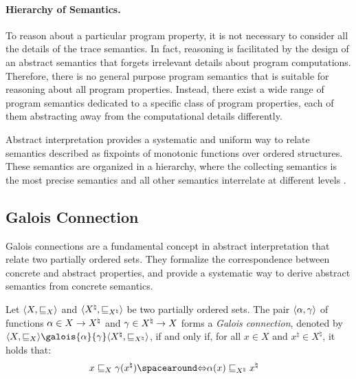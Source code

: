 \paragraph{Hierarchy of Semantics.}

To reason about a particular program property, it is not necessary to consider all the details of the trace semantics.
In fact, reasoning is facilitated by the design of an abstract semantics that forgets irrelevant details about program computations.
Therefore, there is no general purpose program semantics that is suitable for reasoning about all program properties.
Instead, there exist a wide range of program semantics dedicated to a specific class of program properties, each of them abstracting away from the computational details differently.

Abstract interpretation provides a systematic and uniform way to relate semantics described as fixpoints of monotonic functions over ordered structures.
These semantics are organized in a hierarchy, where the collecting semantics is the most precise semantics and all other semantics interrelate at different levels .



\subsection{Galois Connection}

Galois connections are a fundamental concept in abstract interpretation that relate two partially ordered sets.
They formalize the correspondence between concrete and abstract properties, and provide a systematic way to derive abstract semantics from concrete semantics.

\begin{definition}
  Let $\langle X, \sqsubseteq_X \rangle$ and $\langle {X^\natural}, \sqsubseteq_{X^\natural} \rangle$ be two partially ordered sets.
  The pair $\langle \alpha, \gamma \rangle$ of functions $\alpha\in X \to {X^\natural}$ and $\gamma\in {X^\natural} \to X$ forms a \emph{Galois connection}, denoted by $\tuple{X}{\sqsubseteq_X}\galois{\abstraction}{\concretization}\tuple{{X^\natural}}{\sqsubseteq_{X^\natural}}$, if and only if, for all $x\in X$ and ${x^\natural}\in {X^\natural}$, it holds that:
  \begin{align*}
    x \sqsubseteq_X \concretization({x^\natural}) &\IfF \abstraction(x) \sqsubseteq_{X^\natural} {x^\natural}
  \end{align*}
\end{definition}


